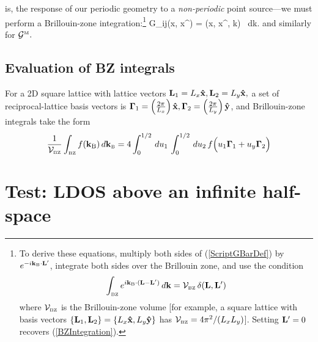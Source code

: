 \documentclass[letterpaper]{article}
\newcommand{\vbGamma}{\boldsymbol{\Gamma}}
\begin{document}
is, the response of our periodic geometry to a \textit{non-periodic}
point source---we must perform a Brillouin-zone 
integration:\footnote{To derive these equations, multiply both sides
of (\ref{ScriptGBarDef}) by $e^{-i\mathbf{k}_{\hbox{\tiny{B}}} \cdot \mathbf{L}^\prime}$,
integrate both sides over the Brillouin zone, and use the
condition 
$$\int_{\hbox{\tiny{BZ}}} e^{i\mathbf{k}_{\hbox{\tiny{B}}}\cdot (\mathbf{L}-\mathbf{L}^\prime)}\,d\mathbf{k}
  =\mathcal{V}_{\hbox{\tiny{BZ}}} \, \delta(\mathbf{L},\mathbf{L}^\prime)
$$
where $\mathcal{V}_{\hbox{\tiny{BZ}}}$ is the Brillouin-zone volume [for example,
a square lattice with basis vectors
$\{\mathbf{L}_1, \mathbf{L}_2\}=\{L_x\mathbf{\hat x}, L_y\mathbf{\hat y}\}$ has
$\mathcal{V}_{\hbox{\tiny{BZ}}}=4\pi^2/(L_x L_y)$].
Setting $\mathbf{L}^\prime=0$ recovers (\ref{BZIntegration}).}
{
  \mc G_{ij}(\vb x, \vb x^\prime)
 = 
   \int{} 
   (\vb x, \vb x^\prime, \vb k)
   \, d\vb k.
}
and similarly for $\mathcal{G}^{\hbox{\tiny{M}}}.$

\subsection*{Evaluation of BZ integrals}

For a 2D square lattice with lattice vectors 
$\mathbf{L}_1=L_x\mathbf{\hat x}, \mathbf{L}_2=L_y\mathbf{\hat x},$
a set of reciprocal-lattice basis vectors is 
$\vbGamma_1=\pf{2\pi}{L_x} \vbhat{x},
 \vbGamma_2=\pf{2\pi}{L_y} \vbhat{y}$,
and Brillouin-zone integrals take the form
$$ \frac{1}{\mc V\subt{BZ}} 
   \int\subt{BZ} f(\vb k\subs{B}) \, d \vb k\subt{B}
  =4\int_0^{1/2} \, d u_1 \, \int_0^{1/2} \, d u_2 \, 
   f\Big( u_1\vbGamma_1 + u_y\vbGamma_2 \Big)
$$

\newpage
\section{Test: LDOS above an infinite half-space}
\end{document}
